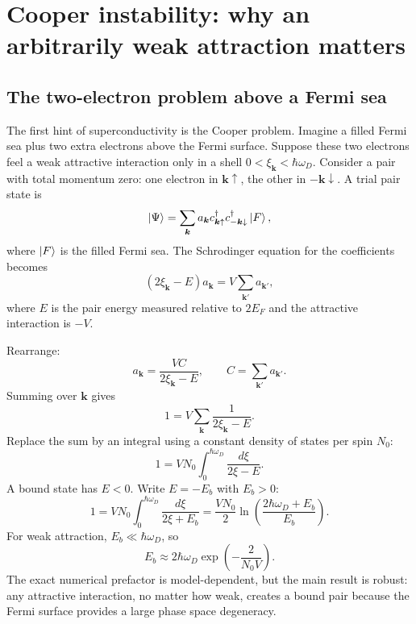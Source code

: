 \documentclass[11pt]{article}
\newcommand{\bk}{{\bm{k}}}
\begin{document}
\section{Cooper instability: why an arbitrarily weak attraction matters}

\subsection{The two-electron problem above a Fermi sea}
The first hint of superconductivity is the Cooper problem. Imagine a filled Fermi sea plus two extra electrons above the Fermi surface. Suppose these two electrons feel a weak attractive interaction only in a shell $0<\xi_\bk<\hbar\omega_D$. Consider a pair with total momentum zero: one electron in $\bk\uparrow$, the other in $-\bk\downarrow$. A trial pair state is
\begin{equation}
\ket{\Psi}=\sum_{\bk}a_\bk c_{\bk\uparrow}^{\dagger}c_{-\bk\downarrow}^{\dagger}\ket{F},
\end{equation}
where $\ket{F}$ is the filled Fermi sea. The Schrodinger equation for the coefficients becomes
\begin{equation}
(2\xi_\bk-E)a_\bk=V\sum_{\bk'}a_{\bk'},
\end{equation}
where $E$ is the pair energy measured relative to $2E_F$ and the attractive interaction is $-V$.

Rearrange:
\begin{equation}
 a_\bk=\frac{V C}{2\xi_\bk-E},\qquad C=\sum_{\bk'}a_{\bk'}.
\end{equation}
Summing over $\bk$ gives
\begin{equation}
 1=V\sum_{\bk}\frac{1}{2\xi_\bk-E}.
\end{equation}
Replace the sum by an integral using a constant density of states per spin $N_0$:
\begin{equation}
1=V N_0\int_0^{\hbar\omega_D}\frac{d\xi}{2\xi-E}.
\end{equation}
A bound state has $E<0$. Write $E=-E_b$ with $E_b>0$:
\begin{equation}
1=V N_0\int_0^{\hbar\omega_D}\frac{d\xi}{2\xi+E_b}
=\frac{V N_0}{2}\ln\left(\frac{2\hbar\omega_D+E_b}{E_b}\right).
\end{equation}
For weak attraction, $E_b\ll\hbar\omega_D$, so
\begin{equation}
E_b\approx 2\hbar\omega_D\exp\left(-\frac{2}{N_0V}\right).
\end{equation}
The exact numerical prefactor is model-dependent, but the main result is robust: any attractive interaction, no matter how weak, creates a bound pair because the Fermi surface provides a large phase space degeneracy.
\end{document}
